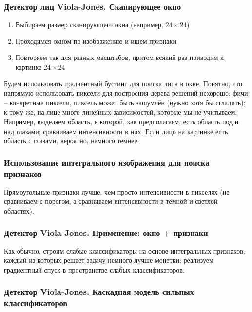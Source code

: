 \documentclass[main.tex]{subfiles}
\begin{document}
\subsubsection{ Детектор лиц Viola-Jones. Сканирующее окно }

\begin{enumerate}[noitemsep]
	\item Выбираем размер сканирующего окна (например, $ 24 \times 24 $)
	\item Проходимся окном по изображению и ищем признаки
	\item Повторяем так для разных масштабов, притом всякий раз приводим к картинке $ 24 \times 24 $
\end{enumerate}

Будем использовать градиентный бустинг для поиска лица в окне.
Понятно, что напрямую использовать пиксели для построения дерева решений нехорошо: фичи -- конкретные пиксели, пиксель может быть зашумлён (нужно хотя бы сгладить); к тому же, на лице много линейных зависимостей, которые мы не учитываем.
Например, выделяем область, в которой, как предполагаем, есть область под и над глазами; сравниваем интенсивности в них.
Если лицо на картинке есть, область с глазами, вероятно, намного темнее.

\subsubsection{Использование интегрального изображения для поиска признаков}


Прямоугольные признаки лучше, чем просто интенсивности в пикселях (не сравниваем с порогом, а сравниваем интенсивности в тёмной и светлой областях).

\subsubsection{Детектор Viola-Jones. Применение: окно + признаки }

Как обычно, строим слабые классификаторы на основе интегральных признаков, каждый из которых решает задачу немного лучше монетки; реализуем градиентный спуск в пространстве слабых классификаторов.

\subsubsection{Детектор Viola-Jones. Каскадная модель сильных классификаторов}
\end{document}
